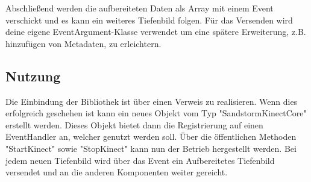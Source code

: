 \begin{Spacing}{\mylinespace}
Abschließend werden die aufbereiteten Daten als Array mit einem Event verschickt und es kann ein weiteres Tiefenbild folgen. Für das Versenden wird deine eigene EventArgument-Klasse verwendet um eine spätere Erweiterung, z.B. hinzufügen von Metadaten, zu erleichtern.

\subsection{Nutzung}

Die Einbindung der Bibliothek ist über einen Verweis zu realisieren. Wenn dies erfolgreich geschehen ist kann ein neues Objekt vom Typ "SandstormKinectCore" erstellt werden. Dieses Objekt bietet dann die Registrierung auf einen EventHandler an, welcher genutzt werden soll.
Über die öffentlichen Methoden "StartKinect" sowie "StopKinect" kann nun der Betrieb hergestellt werden. Bei jedem neuen Tiefenbild wird über das Event ein Aufbereitetes Tiefenbild versendet und an die anderen Komponenten weiter gereicht.

\end{Spacing}
\newpage
\clearpage
